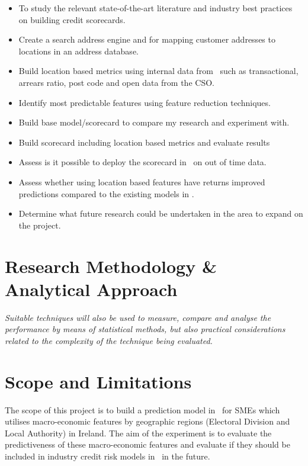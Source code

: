 \begin{itemize}
	\item To study the relevant state-of-the-art literature and industry best practices on building credit scorecards.
	\item Create a search address engine and for mapping customer addresses to locations in an address database.
	\item Build location based metrics using internal data from \subjectname\ such as transactional, arrears ratio, post code and open data from the CSO.
	\item Identify most predictable features using feature reduction techniques.
	\item Build base model/scorecard to compare my research and experiment with.
	\item Build scorecard including location based metrics and evaluate results
	\item Assess is it possible to deploy the scorecard in \subjectname\ on out of time data.
	\item Assess whether using location based features have returns improved predictions compared to the existing models in \subjectname.
	\item Determine what future research could be undertaken in the area to expand on the project.
\end{itemize}
	

\section{Research Methodology \& Analytical Approach}
\textit{Suitable techniques will also be used to measure, compare and analyse the performance by means of statistical methods, but also practical considerations related to the complexity of the technique being evaluated.}


\section{Scope and Limitations}
The scope of this project is to build a prediction model in \subjectname\ for SMEs which utilises macro-economic features by geographic regions (Electoral Division and Local Authority) in Ireland. The aim of the experiment is to evaluate the predictiveness of these macro-economic features and evaluate if they should be included in industry credit risk models in \subjectname\ in the future.


